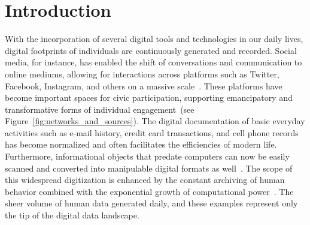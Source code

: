 \documentclass{DESSThesis}
\begin{document}
\def \TypeofThesis{Master's Thesis}
\def \TitleofThesis{Something Interesting and Meaningful}
\def \AuthorofThesis{Your Name}
\def \Supervisor{Your Supervisor/Examiner} %
\def \Advisor{Your Advisor}

\cleardoublepage
{} %

\chapter{Introduction}
\thispagestyle{empty}
With the incorporation of several digital tools and technologies in our daily lives, digital footprints of individuals are continuously generated and recorded. Social media, for instance, has enabled the shift of conversations and communication to online mediums, allowing for interactions across platforms such as Twitter, Facebook, Instagram, and others on a massive scale~\cite{IndiraSen2021ApplyingAT}. These platforms have become important spaces for civic participation, supporting emancipatory and transformative forms of individual engagement~\cite{doi:10.1177/2057047316683200}(see Figure~\ref{fig:networks_and_sources}). The digital documentation of basic everyday activities such as e-mail history, credit card transactions, and cell phone records has become normalized and often facilitates the efficiencies of modern life. Furthermore, informational objects that predate computers can now be easily scanned and converted into manipulable digital formats as well~\cite{annurev:/content/journals/10.1146/annurev-soc-060116-053457}. The scope of this widespread digitization is enhanced by the constant archiving of human behavior combined with the exponential growth of computational power~\cite{annurev:/content/journals/10.1146/annurev-soc-060116-053457}. The sheer volume of human data generated daily, and these examples represent only the tip of the digital data landscape.
\end{document}
